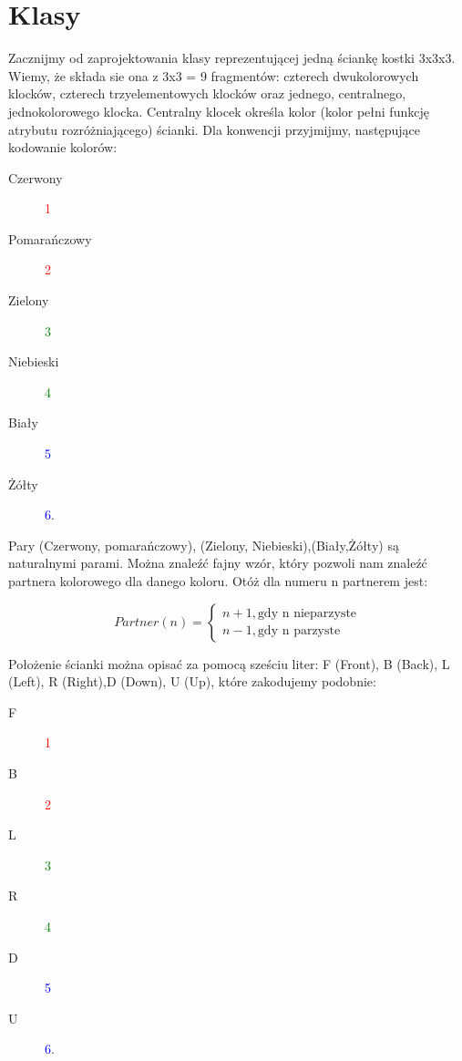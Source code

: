 \documentclass{article}
\begin{document}
\section{Klasy}
Zacznijmy od zaprojektowania  klasy reprezentującej jedną ściankę kostki 3x3x3. Wiemy, że składa sie ona z 3x3 = 9 fragmentów: czterech dwukolorowych klocków, czterech trzyelementowych klocków oraz jednego, centralnego, jednokolorowego klocka. 
Centralny klocek określa kolor (kolor pełni funkcję atrybutu rozróżniającego) ścianki.
Dla konwencji przyjmijmy, następujące kodowanie kolorów:

\begin{description}
\item[Czerwony] \textcolor{red}{1}
\item[Pomarańczowy] \textcolor{red}{2}
\item[Zielony] \textcolor{green}{3}
\item[Niebieski] \textcolor{green}{4}
\item[Biały] \textcolor{blue}{5}
\item[Żółty] \textcolor{blue}{6}.
\end{description}
Pary (Czerwony, pomarańczowy), (Zielony, Niebieski),(Biały,Żółty) są naturalnymi parami.
Można znaleźć fajny wzór, który pozwoli nam znaleźć partnera kolorowego dla danego koloru. Otóż dla numeru n partnerem jest:

\begin{equation}
Partner(n) = \begin{cases}
n+1, \text{gdy n nieparzyste} \\
n-1, \text{gdy n parzyste}

\end{cases}
\end{equation}


Położenie ścianki można opisać za pomocą sześciu liter: F (Front), B (Back), L (Left), R (Right),D (Down), U (Up), które zakodujemy podobnie:
\begin{description}
\item[F] \textcolor{red}{1}
\item[B] \textcolor{red}{2}
\item[L] \textcolor{green}{3}
\item[R] \textcolor{green}{4}
\item[D] \textcolor{blue}{5}
\item[U] \textcolor{blue}{6}. \\
\end{description}
\end{document}
